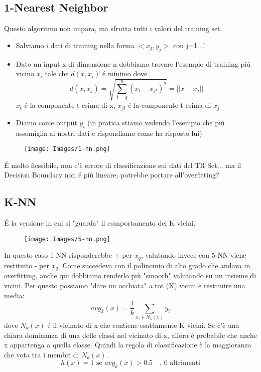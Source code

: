 \documentclass{article}
\begin{document}
\subsection{1-Nearest Neighbor}
Questo algoritmo non impara, ma sfrutta tutti i valori del training set.
\begin{itemize}
    \item Salviamo i dati di training nella forma $<x_j,y_j>$ con j=1...l
    \item Dato un input x di dimensione n dobbiamo trovare l'esempio di training più vicino $x_i$ tale che $d(x,x_i)$ é minimo \newline
        dove \[d(x,x_j)=\sqrt{\sum_{t=q}^n(x_t-x_{jt})^2}=||x-x_j||\] $x_t$ é la componente t-esima di x, $x_{jt}$ é la componente t-esima di $x_j$
    \item Diamo come output $y_i$ (in pratica stiamo vedendo l'esempio che più assomiglia ai nostri dati e rispondiamo come ha risposto lui)
\end{itemize}
\begin{figure}[H]
\centering
\texttt{[image: Images/1-nn.png]}
\end{figure}
É molto flessibile, non c'è errore di classificazione sui dati del TR Set... ma il Decision Boundary non é più lineare, potrebbe portare all'overfitting?
\clearpage

\subsection{K-NN}
É la versione in cui si "guarda" il comportamento dei K vicini.
\begin{figure}[H]
\centering
\texttt{[image: Images/5-nn.png]}
\end{figure}
In questo caso 1-NN risponderebbe + per $x_q$, valutando invece con 5-NN viene restituito - per $x_q$. Come succedeva con il polinomio di alto grado che andava in overfitting, anche qui dobbiamo renderlo più "smooth" valutando su un insieme di vicini. \newline
Per questo possiamo "dare un occhiata" a tot (K) vicini e restituire una media: \[avg_k(x)=\frac{1}{k}\sum_{x_i\in N_k(x)} y_i\] dove $N_k(x)$ é il vicinato di x che contiene esattamente K vicini. Se c'è una chiara dominanza di una delle classi nel vicinato di x, allora é probabile che anche x appartenga a quella classe. Quindi la regola di classificazione è la maggioranza che vota tra i membri di $N_k (x)$. \[h(x)=1 \text{ se } avg_k(x)>0.5 \quad \text{, 0 altrimenti}\]
\end{document}
